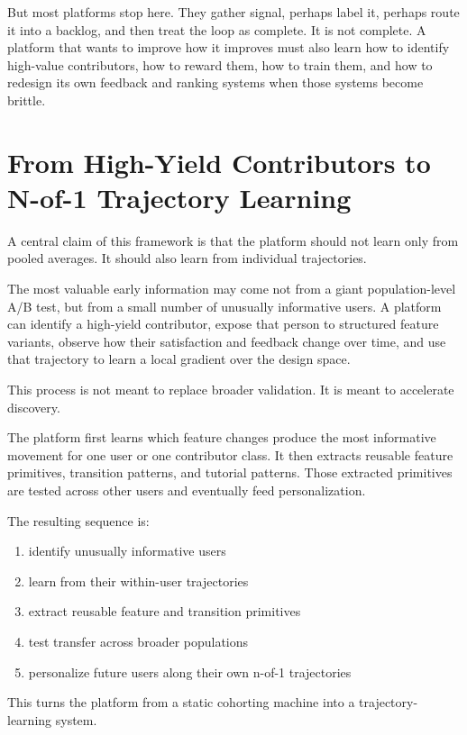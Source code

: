 \documentclass[11pt]{article}
\begin{document}
But most platforms stop here. They gather signal, perhaps label it, perhaps route it into a backlog, and then treat the loop as complete. It is not complete. A platform that wants to improve how it improves must also learn how to identify high-value contributors, how to reward them, how to train them, and how to redesign its own feedback and ranking systems when those systems become brittle.

\section{From High-Yield Contributors to N-of-1 Trajectory Learning}

A central claim of this framework is that the platform should not learn only from pooled averages. It should also learn from individual trajectories.

The most valuable early information may come not from a giant population-level A/B test, but from a small number of unusually informative users. A platform can identify a high-yield contributor, expose that person to structured feature variants, observe how their satisfaction and feedback change over time, and use that trajectory to learn a local gradient over the design space.

This process is not meant to replace broader validation. It is meant to accelerate discovery.

The platform first learns which feature changes produce the most informative movement for one user or one contributor class. It then extracts reusable feature primitives, transition patterns, and tutorial patterns. Those extracted primitives are tested across other users and eventually feed personalization.

The resulting sequence is:

\begin{enumerate}
  \item identify unusually informative users
  \item learn from their within-user trajectories
  \item extract reusable feature and transition primitives
  \item test transfer across broader populations
  \item personalize future users along their own n-of-1 trajectories
\end{enumerate}

This turns the platform from a static cohorting machine into a trajectory-learning system.
\end{document}
